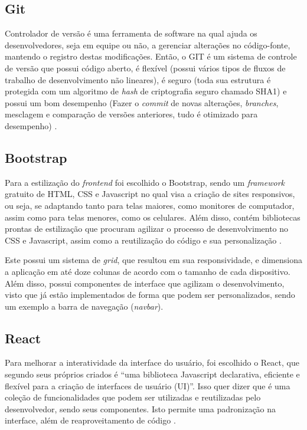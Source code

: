 \subsection{Git}
Controlador de versão é uma ferramenta de software na qual ajuda os desenvolvedores, seja em equipe ou não, a gerenciar alterações no código-fonte, mantendo o registro destas modificações. Então, o GIT é um sistema de controle de versão que possui código aberto, é flexível (possui vários tipos de fluxos de trabalho de desenvolvimento não lineares), é seguro (toda sua estrutura é protegida com um algoritmo de \textit{hash} de criptografia seguro chamado SHA1) e possui um bom desempenho (Fazer o \textit{commit} de novas alterações, \textit{branches}, mesclagem e comparação de versões anteriores, tudo é otimizado para desempenho) \cite{SANTACROCE}.

\subsection{Bootstrap}
Para a estilização do \textit{frontend} foi escolhido o Bootstrap, sendo um \textit{framework} gratuito de HTML, CSS e Javascript no qual visa a criação de sites responsivos, ou seja, se adaptando tanto para telas maiores, como monitores de computador, assim como para telas menores, como os celulares. Além disso, contém bibliotecas prontas de estilização que procuram agilizar o processo de desenvolvimento no CSS e Javascript, assim como a reutilização do código e sua personalização \cite{SPURLOCK}.

Este possui um sistema de \textit{grid}, que resultou em sua responsividade, e dimensiona a aplicação em até doze colunas de acordo com o tamanho de cada dispositivo. Além disso, possui componentes de interface que agilizam o desenvolvimento, visto que já estão implementados de forma que podem ser personalizados, sendo um exemplo a barra de navegação (\textit{navbar}).

\subsection{React}
Para melhorar a interatividade da interface do usuário, foi escolhido o React, que segundo seus próprios criados é “uma biblioteca Javascript declarativa, eficiente e flexível para a criação de interfaces de usuário (UI)”. Isso quer dizer que é uma coleção de funcionalidades que podem ser utilizadas e reutilizadas pelo desenvolvedor, sendo seus componentes. Isto permite uma padronização na interface, além de reaproveitamento de código \cite{ZAMMETTI}.

